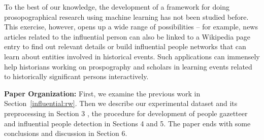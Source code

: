 \documentclass[10pt,journal,compsoc]{IEEEtran}
\begin{document}
To the best of our knowledge, the development of a framework for doing prosopographical research using machine learning has not been studied before. This exercise, however, opens up a wide range of possibilities -- for example, news articles related to the influential person can also be linked to a Wikipedia page entry to find out relevant details or build influential people networks that can learn about entities involved in historical events. Such applications can immensely help historians working on prospography\cite{allen2013toward} and scholars in learning events related to historically significant persons interactively.

\textbf{Paper Organization:} First, we examine the previous work in Section~\ref{influential:rw}. Then we describe our experimental dataset and its preprocessing in Section 3 , the procedure for development of people gazetteer and influential people detection in Sections 4 and 5.  The
paper ends with some conclusions and discussion in Section 6.



%
%  
% 
%
\end{document}
